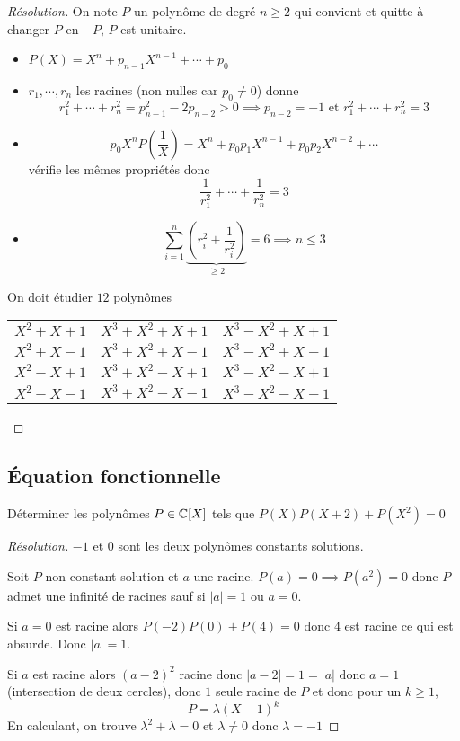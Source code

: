 \begin{proof}[Résolution]
    On note $P$ un polynôme de degré $n\geq 2$ qui convient et quitte à changer $P$ en $-P$, $P$ est unitaire.
    \begin{itemize}
        \item $P(X)=X^n+p_{n-1}X^{n-1}+\cdots +p_0$
        \item $r_1, \cdots, r_n$ les racines (non nulles car $p_0\neq 0$) donne \[
                r_1^2+\cdots +r_n^2=p_{n-1}^2-2p_{n-2}>0 \implies p_{n-2}=-1 \text{ et }r_1^2+\cdots+r_n^2=3
            \]
        \item \[
                p_0 X^n P \left( \frac1X \right)=X^n+p_0p_1X^{n-1}+p_0p_2X^{n-2}+\cdots
            \]
            vérifie les mêmes propriétés donc \[
                \frac 1{r_1^2} +\cdots +\frac1{r_n^2}=3
            \]

        \item \[
                \sum_{i=1}^n\underbrace{\left(r_i^2+\frac1{r_i^2}\right)}_{\geq 2}=6 \implies n\leq 3
            \]
    \end{itemize}
    On doit étudier $12$ polynômes
    \begin{center}
        \begin{tabular}{lll}
            \sout{$X^2+X+1$} & \sout{$X^3+X^2+X+1$} & \sout{$X^3-X^2+X+1$} \\
            $X^2+X-1$ & \sout{$X^3+X^2+X-1$} & \sout{$X^3-X^2+X-1$} \\
            \sout{$X^2-X+1$} & \sout{$X^3+X^2-X+1$} & $X^3-X^2-X+1$ \\
            $X^2-X-1$ & $X^3+X^2-X-1$ & \sout{$X^3-X^2-X-1$}
        \end{tabular}
    \end{center}
\end{proof}

\subsection{Équation fonctionnelle}

\begin{exo}
    Déterminer les polynômes $P\in\mathbb C[X]$ tels que $P(X)P(X+2)+P(X^2)=0$
\end{exo}

\begin{proof}[Résolution] $-1$ et $0$ sont les deux polynômes constants solutions.

    Soit $P$ non constant solution et $a$ une racine. $P(a)=0\implies P(a^2)=0$ donc $P$ admet une infinité de racines sauf si $|a|=1$ ou $a=0$.

    Si $a=0$ est racine alors $P(-2)P(0)+P(4)=0$ donc $4$ est racine ce qui est absurde. Donc $|a|=1$.

    Si $a$ est racine alors $(a-2)^2$ racine donc $|a-2|=1=|a|$ donc $a=1$ (intersection de deux cercles), donc $1$ seule racine de $P$ et donc pour un $k\geq 1$, \[
        P=\lambda(X-1)^k
    \]
    En calculant, on trouve $\lambda^2+\lambda=0$ et $\lambda \neq 0$ donc $\lambda = -1$
\end{proof}

